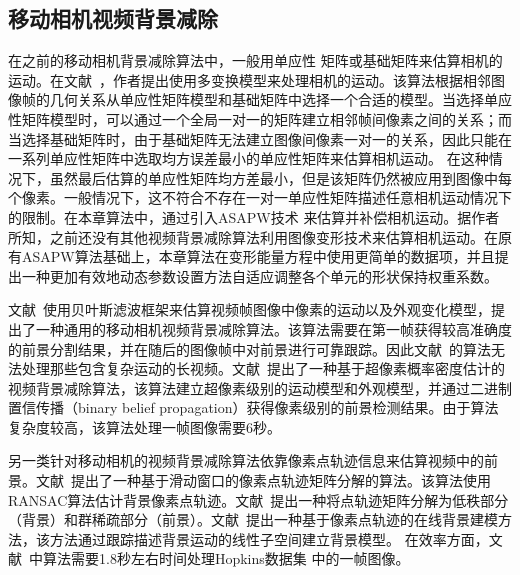 \subsection{移动相机视频背景减除}
\label{ch4:sec:sub:mcbs}
在之前的移动相机背景减除算法中，一般用单应性 矩阵或基础矩阵来估算相机的运动。在文献~，作者提出使用多变换模型来处理相机的运动。该算法根据相邻图像帧的几何关系从单应性矩阵模型和基础矩阵中选择一个合适的模型。当选择单应性矩阵模型时，可以通过一个全局一对一的矩阵建立相邻帧间像素之间的关系；而当选择基础矩阵时，由于基础矩阵无法建立图像间像素一对一的关系，因此只能在一系列单应性矩阵中选取均方误差最小的单应性矩阵来估算相机运动。 在这种情况下，虽然最后估算的单应性矩阵均方差最小，但是该矩阵仍然被应用到图像中每个像素。一般情况下，这不符合不存在一对一单应性矩阵描述任意相机运动情况下的限制。在本章算法中，通过引入ASAPW技术 \cite{Liu2009ASAP,Liu_2013ASAP}来估算并补偿相机运动。据作者所知，之前还没有其他视频背景减除算法利用图像变形技术来估算相机运动。在原有ASAPW算法基础上，本章算法在变形能量方程中使用更简单的数据项，并且提出一种更加有效地动态参数设置方法自适应调整各个单元的形状保持权重系数。 \par

文献~使用贝叶斯滤波框架来估算视频帧图像中像素的运动以及外观变化模型，提出了一种通用的移动相机视频背景减除算法。该算法需要在第一帧获得较高准确度的前景分割结果，并在随后的图像帧中对前景进行可靠跟踪。因此文献~的算法无法处理那些包含复杂运动的长视频。文献~提出了一种基于超像素概率密度估计的视频背景减除算法，该算法建立超像素级别的运动模型和外观模型，并通过二进制置信传播（binary belief propagation）获得像素级别的前景检测结果。由于算法复杂度较高，该算法处理一帧图像需要6秒。\par

另一类针对移动相机的视频背景减除算法依靠像素点轨迹信息来估算视频中的前景。文献~提出了一种基于滑动窗口的像素点轨迹矩阵分解的算法。该算法使用RANSAC\cite{rasac}算法估计背景像素点轨迹。文献~提出一种将点轨迹矩阵分解为低秩部分（背景）和群稀疏部分（前景）。文献~提出一种基于像素点轨迹的在线背景建模方法，该方法通过跟踪描述背景运动的线性子空间建立背景模型。 在效率方面，文献~中算法需要1.8秒左右时间处理Hopkins数据集\cite{HopKinsDataSet} 中的一帧图像。\par

